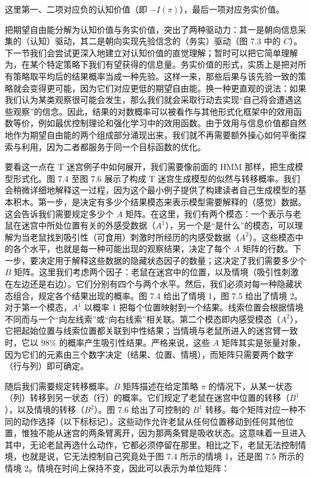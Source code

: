 这里第一、二项对应负的认知价值（即 $-I(\pi)$），最后一项对应务实价值。

把期望自由能分解为认知价值与务实价值，突出了两种驱动力：其一是朝向信息采集的（认知）驱动，其二是朝向实现先验信念的（务实）驱动（图 7.3 中的 $C$）。下一节我们会尝试更深入地建立对认知价值的直觉理解；暂时可以把它简单理解为，在某个特定策略下我们有望获得的信息量。务实价值的形式，实质上是把对所有策略取平均后的结果概率当成一种先验。这样一来，那些后果与该先验一致的策略就会变得更可能，因为它们对应更低的期望自由能。换一种更直观的说法：如果我们认为某类观察很可能会发生，那么我们就会采取行动去实现“自己将会遭遇这些观察”的信念。因此，结果的对数概率可以被看作与其他形式化框架中的效用函数等价，例如最优控制理论和强化学习中的效用函数。由于效用与信息价值都自然地作为期望自由能的两个组成部分涌现出来，我们就不再需要额外操心如何平衡探索与利用，因为二者都服务于同一个目标函数的优化。

要看这一点在 T 迷宫例子中如何展开，我们需要像前面的 HMM 那样，把生成模型形式化。图 7.4 至图 7.6 展示了构成 T 迷宫生成模型的似然与转移概率。我们会稍微详细地解释这一过程，因为这个最小例子提供了构建读者自己生成模型的基本积木。第一步，是决定有多少个结果模态来表示模型需要解释的（感觉）数据。这会告诉我们需要规定多少个 $A$ 矩阵。在这里，我们有两个模态：一个表示与老鼠在迷宫中所处位置有关的外感受数据（$A^1$），另一个是“是什么”的模态，可以理解为当老鼠找到吸引性（可食用）刺激时所经历的内感受数据（$A^2$）。这些模态中的各个水平，也就是每一种可能出现的观察结果，决定了每个 $A$ 矩阵的行数。下一步，要决定用于解释这些数据的隐藏状态因子的数量；这决定了我们需要多少个 $B$ 矩阵。这里我们考虑两个因子：老鼠在迷宫中的位置，以及情境（吸引性刺激在左边还是右边）。它们分别有四个与两个水平。然后，我们必须对每一种隐藏状态组合，规定各个结果出现的概率。图 7.4 给出了情境 1，图 7.5 给出了情境 2。对于第一个模态，$A^1$ 以概率 1 把每个位置映射到一个结果。线索位置会根据情境不同而与一个“向左线索”或“向右线索”相关联。第二个模态即内感受模态（$A^2$），它把起始位置与线索位置都关联到中性结果；当情境与老鼠所进入的迷宫臂一致时，它以 $98\%$ 的概率产生吸引性结果。严格来说，这些 $A$ 矩阵其实是张量对象，因为它们的元素由三个数字决定（结果、位置、情境），而矩阵只需要两个数字（行与列）即可确定。

随后我们需要规定转移概率。$B$ 矩阵描述在给定策略 $\pi$ 的情况下，从某一状态（列）转移到另一状态（行）的概率。它们规定了老鼠在迷宫中位置的转移（$B^1$），以及情境的转移（$B^2$）。图 7.6 给出了可控制的 $B^1$ 转移。每个矩阵对应一种不同的动作选择（以下标标记）。这些动作允许老鼠从任何位置移动到任何其他位置，惟独不能从迷宫的两条臂离开，因为那两条臂是吸收状态。这意味着一旦进入其中，无论老鼠再选什么动作，它都必须停留在那里。相比之下，老鼠无法控制情境，也就是说，它无法控制自己究竟处于图 7.4 所示的情境 1，还是图 7.5 所示的情境 2。情境在时间上保持不变，因此可以表示为单位矩阵：

